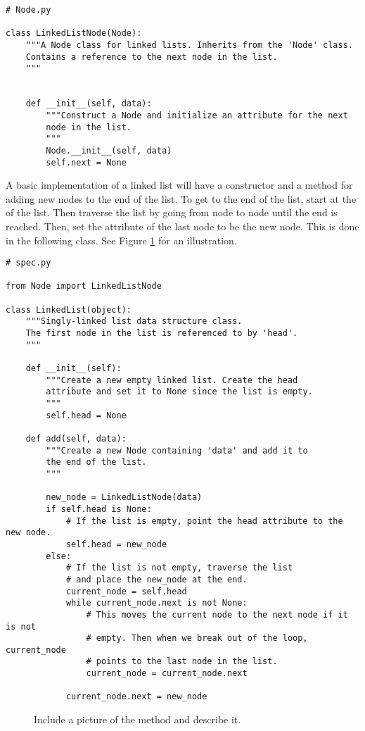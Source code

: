 \begin{lstlisting}
# Node.py

class LinkedListNode(Node):
	"""A Node class for linked lists. Inherits from the 'Node' class.
	Contains a reference to the next node in the list.
    """
	
	
    def __init__(self, data):
        """Construct a Node and initialize an attribute for the next
        node in the list.
        """
        Node.__init__(self, data)
        self.next = None
\end{lstlisting}

A basic implementation of a linked list will have a constructor and a method for adding new nodes to the end of the list.
To get to the end of the list, start at the  of the list.
Then traverse the list by going from node to node until the end is reached.
Then, set the  attribute of the last node to be the new node.
This is done in the following class.
See Figure \ref{fig:add} for an illustration.

\begin{lstlisting}
# spec.py

from Node import LinkedListNode

class LinkedList(object):
	"""Singly-linked list data structure class.
	The first node in the list is referenced to by 'head'.
	"""
	
	def __init__(self):
		"""Create a new empty linked list. Create the head
		attribute and set it to None since the list is empty.
		"""
		self.head = None

	def add(self, data):
		"""Create a new Node containing 'data' and add it to
		the end of the list.
		"""

		new_node = LinkedListNode(data)
		if self.head is None:
			# If the list is empty, point the head attribute to the new node.
			self.head = new_node
		else:
			# If the list is not empty, traverse the list
			# and place the new_node at the end.
			current_node = self.head
			while current_node.next is not None:
				# This moves the current node to the next node if it is not
				# empty. Then when we break out of the loop, current_node
				# points to the last node in the list.
				current_node = current_node.next

			current_node.next = new_node
\end{lstlisting}

\begin{figure}
\centering
\caption{Include a picture of the  method and describe it.}
\label{fig:add}
\end{figure}

